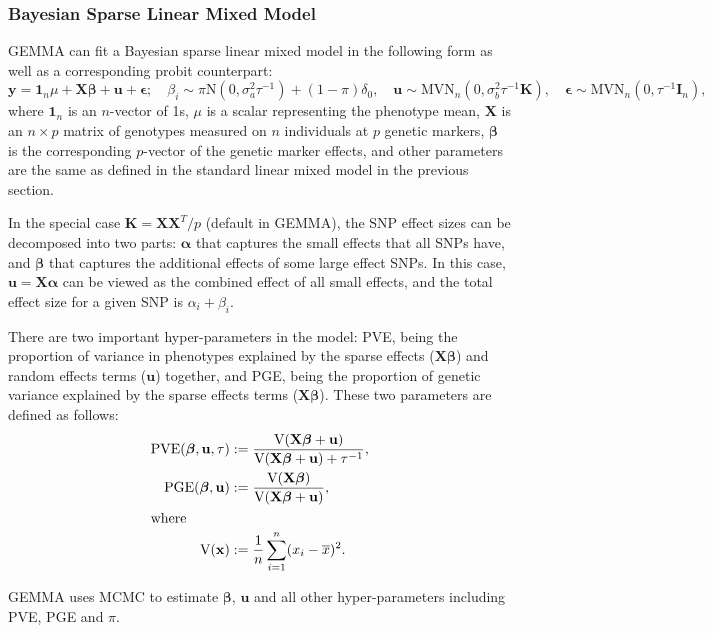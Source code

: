 \documentclass[11pt]{article}
\newcommand{\bu}{\mathbf{u}}
\newcommand{\bK}{\mathbf{K}}
\newcommand{\bX}{\mathbf{X}}
\newcommand{\bI}{\mathbf{I}}
\newcommand{\bepsilon}{\boldsymbol\epsilon}
\newcommand{\bbeta}{\boldsymbol\beta}
\newcommand{\balpha}{\boldsymbol\alpha}
\begin{document}
\subsubsection{Bayesian Sparse Linear Mixed Model}
GEMMA can fit a Bayesian sparse linear mixed model in the following form as well as a corresponding probit counterpart:
%
\begin{equation*}
\mathbf y=\mathbf 1_n\mu+\bX\bbeta+\bu+\bepsilon;   \quad \beta_i \sim \pi \mbox{N}(0, \sigma_a^2\tau^{-1})+(1-\pi)\delta_0, \quad \bu\sim \mbox{MVN}_n(0, \sigma_b^2 \tau^{-1} \bK), \quad \bepsilon \sim \mbox{MVN}_n(0, \tau^{-1} \bI_n),
\end{equation*}
%
where $\mathbf 1_n$ is an $n$-vector of 1s, $\mu$ is a scalar representing the phenotype mean, $\mathbf X$ is an $n \times p$ matrix of genotypes measured on $n$ individuals at $p$ genetic markers, $\bbeta$ is the corresponding $p$-vector of the genetic marker effects, and other parameters are the same as defined in the standard linear mixed model in the previous section.

In the special case $\bK=\bX\bX^T/p$ (default in GEMMA), the SNP effect sizes can be decomposed into two parts: $\balpha$ that captures the small effects that all SNPs have, and $\bbeta$ that captures the additional effects of some large effect SNPs. In this case, $\bu=\bX\balpha$ can be viewed as the combined effect of all small effects, and the total effect size for a given SNP is $\alpha_i+\beta_i$. 

There are two important hyper-parameters in the model: PVE, being the proportion of variance in phenotypes explained by the sparse effects ($\bX\bbeta$) and random effects terms ($\bu$) together, and PGE, being the proportion of genetic variance explained by the sparse effects terms ($\mathbf X\boldsymbol\beta$). These two parameters are defined as follows:
\begin{align*}
\mbox{PVE}(\bbeta, \bu, \tau) & :=\frac{\mbox{V}(\bX\bbeta+\bu)}{\mbox{V}(\bX\bbeta+\bu)+\tau^{-1}}, \\  
\mbox{PGE}(\bbeta, \bu) & :=\frac{\mbox{V}(\bX\bbeta)}{\mbox{V}(\bX\bbeta+\bu)}, \\
\intertext{where}  
\mbox{V}({\bf x}) &:=\frac{1}{n}\sum_{i=1}^n (x_i-\overline {x})^2.
\end{align*}

GEMMA uses MCMC to estimate $\boldsymbol\beta$, $\mathbf u$ and all other hyper-parameters including PVE, PGE and $\pi$. 
\end{document}
